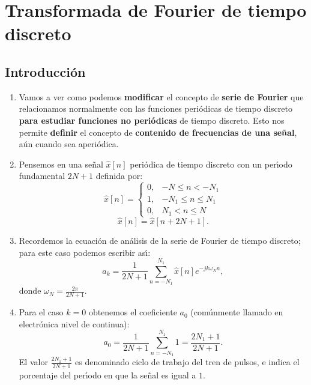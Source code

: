 \chapter{Transformada de Fourier de tiempo discreto}

\section{Introducci\'{o}n}

\begin{enumerate}
	\item Vamos a ver como podemos \textbf{modificar} el concepto de \textbf{serie de Fourier} que relacionamos normalmente con las funciones peri\'{o}dicas de tiempo discreto \textbf{para estudiar funciones no peri\'{o}dicas} de tiempo discreto. Esto nos permite \textbf{definir} el concepto de \textbf{contenido de frecuencias de una se\~{n}al}, a\'{u}n cuando sea aperi\'{o}dica.
	
	\item Pensemos en una se\~{n}al $\hat{x}[n]$ peri\'{o}dica de tiempo discreto con un per\'{\i}odo fundamental $2N + 1$ definida por:
	\begin{equation}
		\hat{x}[n] = 
		\begin{cases} 
			0, & -N \leq n < -N_{1} \\ 
			1, & -N_{1} \leq n \leq N_{1} \\ 
			0, & N_{1} < n \leq N 
		\end{cases}
	\end{equation}
	\begin{equation}
		\hat{x}[n] = \hat{x}[n + 2N + 1].
	\end{equation}
	
	\item Recordemos la ecuaci\'{o}n de an\'{a}lisis de la serie de Fourier de tiempo discreto; para este caso podemos escribir as\'{\i}:
	\begin{equation}
		a_{k} = \frac{1}{2N + 1} \sum_{n=-N_{1}}^{N_{1}} \hat{x}[n] e^{-jk\omega_{N}n},
	\end{equation}
	donde $\omega_{N} = \frac{2\pi}{2N + 1}$.
	
	\item Para el caso $k=0$ obtenemos el coeficiente $a_{0}$ (com\'{u}nmente llamado en electr\'{o}nica nivel de continua):
	\begin{equation}
		a_{0} = \frac{1}{2N + 1} \sum_{n=-N_{1}}^{N_{1}} 1 = \frac{2N_{1} + 1}{2N + 1}.
	\end{equation}
	El valor $\frac{2N_{1} + 1}{2N + 1}$ es denominado ciclo de trabajo del tren de pulsos, e indica el porcentaje del per\'{\i}odo en que la se\~{n}al es igual a $1$.
	

\end{enumerate}
